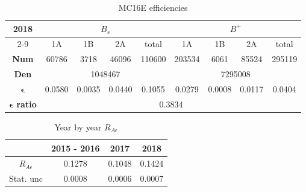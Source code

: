 \begin{table}[h!]
\centering
\begin{tabular}{|c|cccccccc|}
\hline
\multirow{2}{*}{2018}                  & \multicolumn{4}{c|}{$B_s$}                                                                                            & \multicolumn{4}{c|}{$B^+$}                                                                       \\ \cline{2-9} 
                                       & \multicolumn{1}{c|}{1A}     & \multicolumn{1}{c|}{1B}     & \multicolumn{1}{c|}{2A}     & \multicolumn{1}{c|}{total}  & \multicolumn{1}{c|}{1A}     & \multicolumn{1}{c|}{1B}     & \multicolumn{1}{c|}{2A}     & total  \\ \hline
\textbf{Num}                           & \multicolumn{1}{c|}{60786}  & \multicolumn{1}{c|}{3718}   & \multicolumn{1}{c|}{46096}  & \multicolumn{1}{c|}{110600} & \multicolumn{1}{c|}{203534} & \multicolumn{1}{c|}{6061}   & \multicolumn{1}{c|}{85524}  & 295119 \\ \hline
\textbf{Den}                           & \multicolumn{4}{c|}{1048467}                                                                                          & \multicolumn{4}{c|}{7295008}                                                                     \\ \hline
$\boldsymbol{\epsilon}$                & \multicolumn{1}{c|}{0.0580} & \multicolumn{1}{c|}{0.0035} & \multicolumn{1}{c|}{0.0440} & \multicolumn{1}{c|}{0.1055} & \multicolumn{1}{c|}{0.0279} & \multicolumn{1}{c|}{0.0008} & \multicolumn{1}{c|}{0.0117} & 0.0404 \\ \hline
\textbf{$\boldsymbol{\epsilon}$ ratio} & \multicolumn{8}{c|}{0.3834}                                                                                                                                                                                              \\ \hline
\end{tabular}
\caption{MC16E efficiencies}
\label{table::efficiencies MC16E}
\end{table}



\begin{table}[h]
    \centering
    \begin{tabular}{|c|c|c|c|}\hline
         &   2015 - 2016& 2017& 2018\\\hline
         $R_{A \epsilon}$& 
     0.1278& 0.1048& 0.1424\\\hline
 Stat. unc& 0.0008& 0.0006& 0.0007\\ \hline\end{tabular}
    \caption{Year by year $R_{A \epsilon}$}
    \label{table:Ratio by year}
\end{table}

